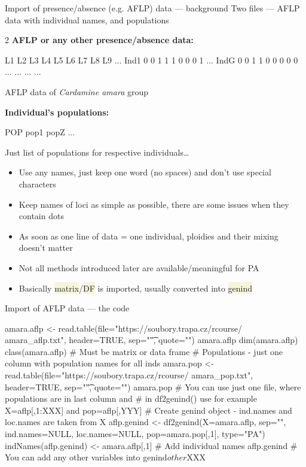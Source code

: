 \documentclass[compress, xelatex, 11pt, xcolor=svgnames, aspectratio=169, url={hyphens, lowtilde}]{beamer}
\renewcommand{\texttt}[1]{\colorbox{Beige}{{\ttfamily #1}}}
\begin{document}
\begin{frame}[fragile]{Import of presence/absence (e.g. AFLP) data --- background}
	Two files --- AFLP data with individual names, and populations
	\vfill
	\begin{multicols}{2}
	\vfill
	\textbf{AFLP or any other presence/absence data:}
	\vfill
	\begin{spluscode}
        L1 L2 L3 L4 L5 L6 L7 L8 L9 ...
    Ind1 0  0  1  1  1  0  0  0  1 ...
    IndG 0  0  1  1  0  0  0  0  0 ...
     ...  ...                      ...
	\end{spluscode}
	\vfill
	\begin{footnotesize}
		AFLP data of \textit{Cardamine amara} group
	\end{footnotesize}
	\vfill
	\textbf{Individual's populations:}
	\vfill
	\begin{spluscode}
    POP
    pop1
    popZ
    ...
	\end{spluscode}
	\vfill
	\begin{footnotesize}
		Just list of populations for respective individuals\ldots
	\end{footnotesize}
	\columnbreak
	\begin{itemize}
		\item Use any names, just keep one word (no spaces) and don't use special characters
		\item Keep names of loci as simple as possible, there are some issues when they contain dots
		\item As soon as one line of data = one individual, ploidies and their mixing doesn't matter
		\item Not all methods introduced later are available/meaningful for PA
		\item Basically \texttt{matrix}/\texttt{DF} is imported, usually converted into \texttt{genind}
	\end{itemize}
	\end{multicols}
\end{frame}

\begin{frame}[fragile]{Import of AFLP data --- the code}
	\begin{spluscode}
    amara.aflp <- read.table(file="https://soubory.trapa.cz/rcourse/
      amara_aflp.txt", header=TRUE, sep="\t", quote="")
    amara.aflp
    dim(amara.aflp)
    class(amara.aflp) # Must be matrix or data frame
    # Populations - just one column with population names for all inds
    amara.pop <- read.table(file="https://soubory.trapa.cz/rcourse/
      amara_pop.txt", header=TRUE, sep="\t", quote="")
    amara.pop
    # You can use just one file, where populations are in last column and
    # in df2genind() use for example X=aflp[,1:XXX] and pop=aflp[,YYY]
    # Create genind object - ind.names and loc.names are taken from X
    aflp.genind <- df2genind(X=amara.aflp, sep="", ind.names=NULL,
      loc.names=NULL, pop=amara.pop[,1], type="PA")
    indNames(aflp.genind) <- amara.aflp[,1] # Add individual names
    aflp.genind
    # You can add any other variables into genind$other$XXX
	\end{spluscode}
\end{frame}
\end{document}
